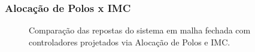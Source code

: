 \subsubsection{Alocação de Polos x IMC}

\begin{figure}[!ht]
    \caption{Comparação das repostas do sistema em malha fechada com
    controladores projetados via Alocação de Polos e IMC.}
    \vspace{-10pt}
    \hspace{-30pt}
    \label{fig:comparacao-entre-imc-e-alocacao-de-polos}
    \begin{minipage}{\linewidth}
        
    \end{minipage}
\end{figure}
